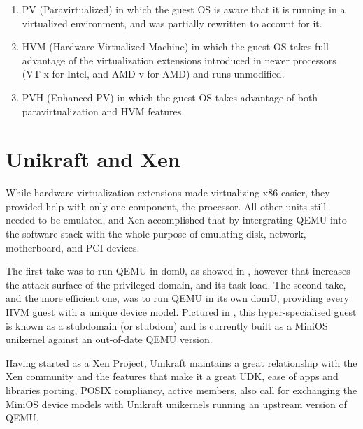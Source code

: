 \begin{enumerate}
  \item PV (Paravirtualized) in which the guest OS is aware that it is running in a virtualized environment, and was partially rewritten to account for it.
  \item HVM (Hardware Virtualized Machine) in which the guest OS takes full advantage of the virtualization extensions introduced in newer processors (VT-x for Intel, and AMD-v for AMD) and runs unmodified.
  \item PVH (Enhanced PV) in which the guest OS takes advantage of both paravirtualization and HVM features.
\end{enumerate}

\section{Unikraft and Xen}
\label{sec:unikraft-xen}

While hardware virtualization extensions made virtualizing x86 easier, they provided help with only one component, the processor.
All other units still needed to be emulated, and Xen accomplished that by intergrating QEMU into the software stack with the whole purpose of emulating disk, network, motherboard, and PCI devices.

The first take was to run QEMU in dom0, as showed in  , however that increases the attack surface of the privileged domain, and its task load.
The second take, and the more efficient one, was to run QEMU in its own domU, providing every HVM guest with a unique device model.
Pictured in , this hyper-specialised guest is known as a stubdomain (or stubdom) and is currently built as a MiniOS unikernel against an out-of-date QEMU version.


Having started as a Xen Project, Unikraft maintains a great relationship with the Xen community and the features that make it a great UDK, ease of apps and libraries porting, POSIX compliancy,  active members, also call for exchanging the MiniOS device models with Unikraft unikernels running an upstream version of QEMU.


